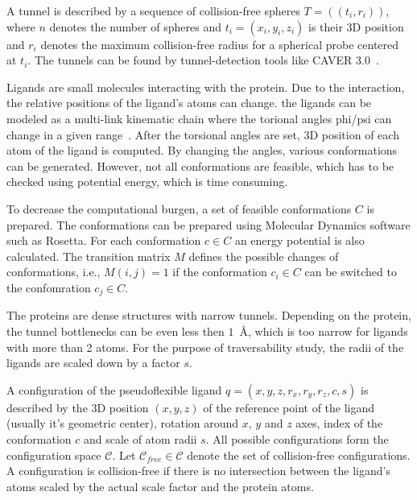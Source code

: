 \documentclass{llncs}
\def\C{\mathcal{C}}
\def\CF{\mathcal{C}_{free}}
\begin{document}
A tunnel is described by a sequence of collision-free spheres $T=( (t_i, r_i) )$, where $n$ denotes the number of spheres and
$t_i=(x_i,y_i,z_i)$ is their 3D position and $r_i$ denotes the maximum collision-free radius for a spherical probe centered
at $t_i$. 
The tunnels can be found by tunnel-detection tools like CAVER 3.0~\cite{caver3}.

Ligands are small molecules interacting with the protein. 
Due to the interaction, the relative positions of the ligand's atoms can change.
the ligands  can be modeled as a multi-link kinematic chain where the torional angles phi/psi can change in a given range~\cite{songPFpath}.
After the torsional angles are set, 3D position of each atom of the ligand is computed.
By changing the angles, various conformations can be generated.
However, not all conformations are feasible, which has to be checked using potential energy, which is time consuming.

To decrease the computational burgen, a set of feasible conformations $C$ is prepared.
The conformations can be prepared using Molecular Dynamics software such as Rosetta.
For each conformation $c\in C$ an energy potential is also calculated.
The transition matrix $M$ defines the possible changes of conformations, i.e., $M(i,j)=1$ if the conformation $c_i \in C$
can be switched to the confomration $c_j \in C$.

The proteins are dense structures with narrow tunnels.
Depending on the protein, the tunnel bottlenecks can be even less then $1$~\AA, which is too narrow for ligands with more than 2 atoms.
For the purpose of traversability study, the radii of the ligands are scaled down by a factor $s$.

A configuration of the pseudoflexible ligand $q=(x,y,z,r_x,r_y,r_z,c,s)$ is described
by the 3D position $(x,y,z)$ of the reference point of the ligand (usually it's geometric center), rotation around $x$, $y$ and $z$ axes,
index of the conformation $c$ and scale of atom radii $s$.
All possible configurations form the configuration space $\C$. 
Let $\CF \in \C$ denote the set of collision-free configurations. 
A configuration is collision-free if there is no intersection between the ligand's atoms scaled by the actual scale factor and the protein atoms.
\end{document}
